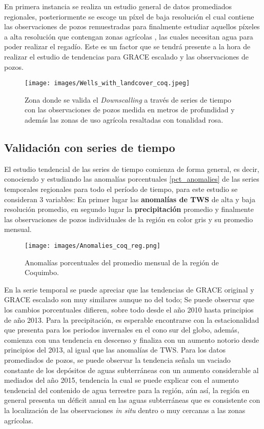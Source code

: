 En primera instancia se realiza un estudio general de datos promediados regionales, 
posteriormente se escoge un píxel de baja resolución el cual contiene las observaciones de pozos remuestradas para finalmente estudiar aquellos píxeles a alta resolución que contengan zonas agrícolas \cite{LC}, las cuales necesitan agua para 
poder realizar el regadío. Este es un factor que se tendrá presente a la hora de realizar el estudio de tendencias para GRACE escalado y las observaciones de pozos.

\begin{figure}[H]
    \centering
          \texttt{[image: images/Wells\_with\_landcover\_coq.jpeg]}
          \vskip -0.1in
    \caption[Zona de validación con series de tiempo]{\footnotesize Zona donde se valida el \textit{Downscalling} a través de series de tiempo con las observaciones de pozos medida en metros de profundidad y además las zonas de uso agrícola resaltadas con tonalidad rosa.}
    \label{szcoq}
\end{figure}

\subsection{Validación con series de tiempo}
El estudio tendencial de las series de tiempo comienza de forma general, es decir, conociendo y estudiando las anomalías porcentuales \ref{pct_anomalies} de las series temporales regionales para todo el período de tiempo, para este estudio se consideran 3 variables: En primer lugar las \textbf{anomalías de TWS} de alta y baja resolución promedio, en segundo lugar la 
\textbf{precipitación} promedio y finalmente las observaciones de pozos individuales de la región en color gris y su promedio mensual.

\begin{figure}[H]
    \centering
          \texttt{[image: images/Anomalies\_coq\_reg.png]}
          \vskip -0.1in
    \caption[Series de tiempo para la región de Coquimbo]{\footnotesize Anomalías porcentuales del promedio mensual de la región de Coquimbo.}
    \label{tscoq}
\end{figure}
En la serie temporal se puede apreciar que las tendencias de GRACE original y GRACE escalado son muy similares aunque no del todo; Se puede observar que los cambios porcentuales difieren, sobre todo desde el año 2010 hasta principios de año 2013. Para la precipitación,
es esperable encontrarse con la estacionalidad que presenta para los periodos invernales en el cono sur del globo, además, comienza con una tendencia en descenso y finaliza con un aumento notorio desde principios del 2013, al igual que las anomalías de TWS. Para los datos promediados de pozos, 
se puede observar la tendencia señala un vaciado constante de los depósitos de aguas subterráneas con un aumento considerable al mediados del año 2015, tendencia la cual se puede explicar con el aumento tendencial del contenido de 
agua terrestre para la región, aún así, la región en general presenta un déficit anual en las aguas subterráneas que es consistente con la localización de las observaciones \textit{in situ} dentro o muy cercanas a las zonas agrícolas. 

